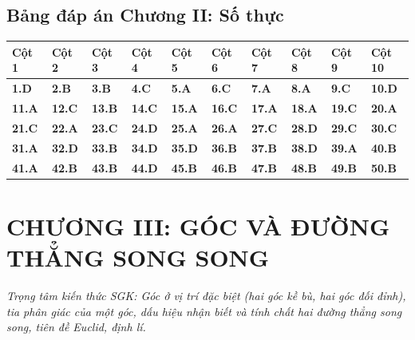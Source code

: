 \documentclass[11pt,a4paper]{article}
\begin{document}
\subsection*{\color{primary} Bảng đáp án Chương II: Số thực}
\begin{center}
\renewcommand{\arraystretch}{1.25}
\begin{tabularx}{\textwidth}{*{10}{>{\centering\arraybackslash}X}}
\toprule
\textbf{\color{primary} Cột 1} & \textbf{\color{primary} Cột 2} & \textbf{\color{primary} Cột 3} & \textbf{\color{primary} Cột 4} & \textbf{\color{primary} Cột 5} & \textbf{\color{primary} Cột 6} & \textbf{\color{primary} Cột 7} & \textbf{\color{primary} Cột 8} & \textbf{\color{primary} Cột 9} & \textbf{\color{primary} Cột 10} \\
\midrule
\textbf{1.D} & \textbf{2.B} & \textbf{3.B} & \textbf{4.C} & \textbf{5.A} & \textbf{6.C} & \textbf{7.A} & \textbf{8.A} & \textbf{9.C} & \textbf{10.D} \\
\rowcolor{rowtint} \textbf{11.A} & \textbf{12.C} & \textbf{13.B} & \textbf{14.C} & \textbf{15.A} & \textbf{16.C} & \textbf{17.A} & \textbf{18.A} & \textbf{19.C} & \textbf{20.A} \\
\textbf{21.C} & \textbf{22.A} & \textbf{23.C} & \textbf{24.D} & \textbf{25.A} & \textbf{26.A} & \textbf{27.C} & \textbf{28.D} & \textbf{29.C} & \textbf{30.C} \\
\rowcolor{rowtint} \textbf{31.A} & \textbf{32.D} & \textbf{33.B} & \textbf{34.D} & \textbf{35.D} & \textbf{36.B} & \textbf{37.B} & \textbf{38.D} & \textbf{39.A} & \textbf{40.B} \\
\textbf{41.A} & \textbf{42.B} & \textbf{43.B} & \textbf{44.D} & \textbf{45.B} & \textbf{46.B} & \textbf{47.B} & \textbf{48.B} & \textbf{49.B} & \textbf{50.B} \\
\bottomrule
\end{tabularx}
\end{center}\vspace{10pt}
\section*{\color{primary} CHƯƠNG III: GÓC VÀ ĐƯỜNG THẲNG SONG SONG}
\textit{Trọng tâm kiến thức SGK: Góc ở vị trí đặc biệt (hai góc kề bù, hai góc đối đỉnh), tia phân giác của một góc, dấu hiệu nhận biết và tính chất hai đường thẳng song song, tiên đề Euclid, định lí.}\par\vspace{4pt}
\end{document}
